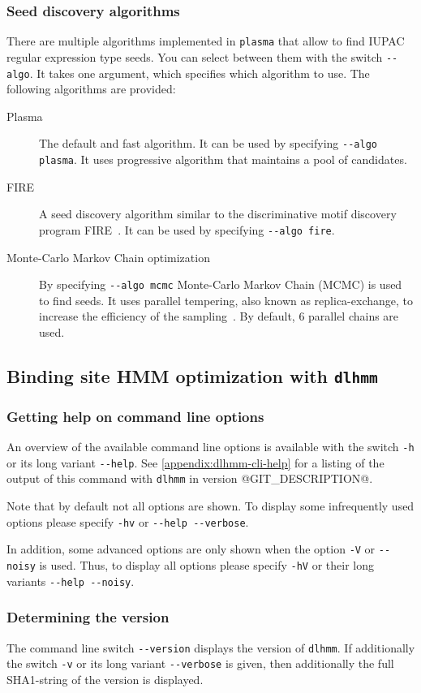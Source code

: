 \documentclass[a4paper]{article}
\makeatletter
\newcommand{\plasma}[0]{\texttt{plasma}}
\newcommand{\dlhmm}[0]{\texttt{dlhmm}}
\newcommand{\version}[0]{@GIT_DESCRIPTION@}
\makeatother
\begin{document}
\subsubsection{Seed discovery algorithms}
There are multiple algorithms implemented in \plasma{} that allow to find IUPAC regular expression type seeds.
You can select between them with the switch \verb|--algo|.
It takes one argument, which specifies which algorithm to use.
The following algorithms are provided:
\begin{description}
  \item[Plasma]
    The default and fast algorithm.
    It can be used by specifying \verb|--algo plasma|.
    It uses progressive algorithm that maintains a pool of candidates.
  \item[FIRE]
    A seed discovery algorithm similar to the discriminative motif discovery program FIRE~\cite{Elemento2007}.
    It can be used by specifying \verb|--algo fire|.
  \item[Monte-Carlo Markov Chain optimization]
    By specifying \verb|--algo mcmc| Monte-Carlo Markov Chain (MCMC) is used to find seeds.
    It uses parallel tempering, also known as replica-exchange, to increase the efficiency of the sampling~\cite{Earl2005}.
    By default, 6 parallel chains are used.
\end{description}

\subsection{Binding site HMM optimization with \dlhmm{}}
\label{subsection:running-dlhmm}
\subsubsection{Getting help on command line options}
An overview of the available command line options is available with the switch \verb|-h| or its long variant \verb|--help|.
See \cref{appendix:dlhmm-cli-help} for a listing of the output of this command with \dlhmm{} in version \version{}.

Note that by default not all options are shown.
To display some infrequently used options please specify \verb|-hv| or \verb|--help --verbose|.

In addition, some advanced options are only shown when the option \verb|-V| or \verb|--noisy| is used.
Thus, to display all options please specify \verb|-hV| or their long variants \verb|--help --noisy|.

\subsubsection{Determining the version}
The command line switch \verb|--version| displays the version of \dlhmm{}.
If additionally the switch \verb|-v| or its long variant \verb|--verbose| is given, then additionally the full SHA1-string of the version is displayed.
\end{document}
